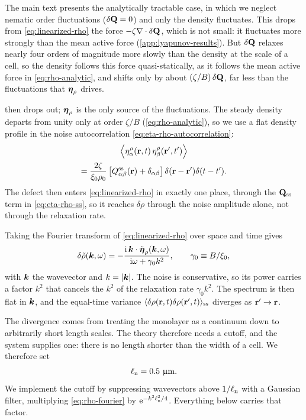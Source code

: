 \documentclass[aps,pre,reprint,superscriptaddress,longbibliography,nofootinbib
]{revtex4-2}
\begin{document}
The main text presents the analytically tractable case, in
which we neglect nematic order fluctuations ($\delta\mathbf{Q}=0$)
and only the density fluctuates. This drops from
\cref{eq:linearized-rho} the force
$-\zeta\nabla\cdot\delta\mathbf{Q}$, which is not small: it
fluctuates more strongly than the mean active force
(\cref{app:lyapunov-results}). But $\delta\mathbf{Q}$ relaxes
nearly four orders of magnitude more slowly than the
density at the scale of a cell, so the density follows this
force quasi-statically, as it follows the mean active force
in \cref{eq:rho-analytic}, and shifts only by about
$(\zeta/B)\,\delta\mathbf{Q}$, far less than the fluctuations that
$\boldsymbol\eta_\rho$ drives.

 then drops out; $\boldsymbol\eta_\rho$ is the
only source of the fluctuations. The steady density departs
from unity only at order $\zeta/B$
(\cref{eq:rho-analytic}), so we use a flat density profile
in the noise autocorrelation
\eqref{eq:eta-rho-autocorrelation}:
\begin{multline}
  \label{eq:eta-rho-ss}
  \left\langle \eta^{\rho}_\alpha(\mathbf{r},t) \,\eta^{\rho}_\beta(\mathbf{r}',t') \right\rangle
  \\
  =\frac{2\zeta}{\xi_0\rho_0}
  \left[Q^{\mathrm{ss}}_{\alpha\beta}(\mathbf{r})+\delta_{\alpha\beta}\right]
 \delta(\mathbf{r}-\mathbf{r}')\delta(t-t').
\end{multline}
The defect then enters \cref{eq:linearized-rho} in exactly
one place, through the $\mathbf{Q}_{\mathrm{ss}}$ term in
\cref{eq:eta-rho-ss}, so it reaches $\delta\rho$ through
the noise amplitude alone, not through the relaxation rate.

Taking the Fourier transform of \cref{eq:linearized-rho}
over space and time gives
\begin{align}
  \label{eq:rho-fourier}
  \delta\tilde\rho(\boldsymbol{k},\omega) =
  -\frac{\mathrm{i}\,\boldsymbol{k}\cdot\tilde {\boldsymbol\eta}_\rho(\boldsymbol{k},\omega)}{\mathrm{i}\omega+\gamma_0 k^2},
  \qquad \gamma_0 \equiv B/\xi_0,
\end{align}
with $\boldsymbol{k}$ the wavevector and $k=|\boldsymbol{k}|$. The noise is
conservative, so its power carries a factor $k^2$ that
cancels the $k^2$ of the relaxation rate $\gamma_0k^2$. The
spectrum is then flat in $\boldsymbol{k}$, and the equal-time variance
$\langle\delta\rho(\mathbf{r},t)\delta\rho(\mathbf{r}',t)\rangle_{\mathrm{ss}}$
diverges as $\mathbf{r}'\to\mathbf{r}$.

The divergence comes from treating the monolayer as a
continuum down to arbitrarily short length scales. The
theory therefore needs a cutoff, and the system supplies
one: there is no length shorter than the width of a cell.
We therefore set
\begin{equation}
    \label{eq:cutoff}
    \ell_{\rm n} = 0.5~\upmu\mathrm{m}.
\end{equation}
We implement the cutoff by suppressing wavevectors above
$1/\ell_{\rm n}$ with a Gaussian filter, multiplying
\cref{eq:rho-fourier} by $\mathrm{e}^{-k^2\ell_{\rm n}^2/4}$. Everything
below carries that factor.
\end{document}
